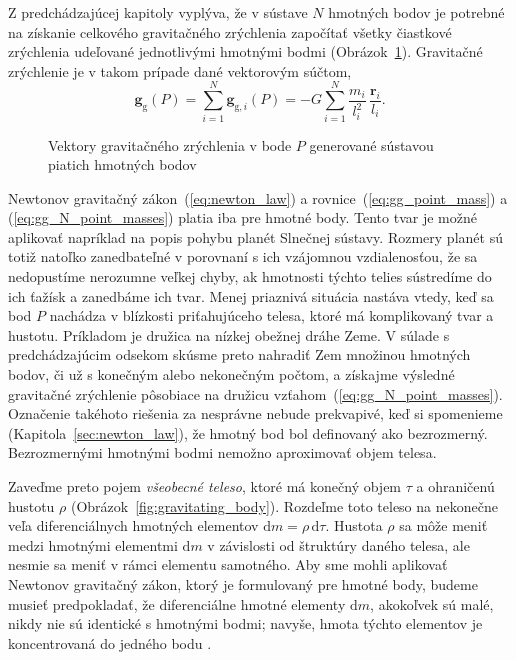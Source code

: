 \documentclass[a4paper, 12pt]{book}
\newcommand{\diff}{\mathrm d}
\newcommand{\gidx}{\mathrm g}
\let\vec\mathbf
\begin{document}
Z predchádzajúcej kapitoly vyplýva, že v sústave $N$ hmotných bodov je potrebné 
na získanie celkového gravitačného zrýchlenia započítať všetky čiastkové 
zrýchlenia udeľované jednotlivými hmotnými bodmi 
(Obrázok~\ref{fig:gg_n_point_masses}).  Gravitačné zrýchlenie je v takom 
prípade dané vektorovým súčtom,
%
\begin{equation}
\label{eq:gg_N_point_masses}
\vec g_\gidx(P) = \sum_{i = 1}^{N}\vec g_{\gidx,i}(P) = -G \sum_{i = 1}^{N} 
\frac{m_i}{l_i^2} \, \frac{\vec r_i}{l_i}{.}
\end{equation}

\begin{figure}[b]
\centering

\caption{Vektory gravitačného zrýchlenia v bode $P$ generované sústavou piatich 
hmotných bodov}
\label{fig:gg_n_point_masses}
\end{figure}

Newtonov gravitačný zákon~(\ref{eq:newton_law}) 
a rovnice~(\ref{eq:gg_point_mass}) 
a (\ref{eq:gg_N_point_masses}) platia iba pre hmotné body.  
Tento tvar je možné aplikovať napríklad na popis pohybu planét Slnečnej 
sústavy.  Rozmery planét sú totiž natoľko zanedbateľné v porovnaní s ich 
vzájomnou vzdialenosťou, že sa nedopustíme nerozumne veľkej chyby, ak hmotnosti 
týchto telies sústredíme do ich ťažísk a zanedbáme ich tvar.  Menej priaznivá 
situácia nastáva vtedy, keď sa bod $P$ nachádza v blízkosti priťahujúceho 
telesa, ktoré má komplikovaný tvar a hustotu.  Príkladom je družica na nízkej 
obežnej dráhe Zeme.  V súlade s predchádzajúcim odsekom skúsme preto nahradiť 
Zem množinou hmotných bodov, či už s konečným alebo nekonečným počtom, 
a získajme výsledné gravitačné zrýchlenie pôsobiace na družicu 
vzťahom~(\ref{eq:gg_N_point_masses}).  Označenie takéhoto 
riešenia za nesprávne nebude prekvapivé, keď si spomenieme 
(Kapitola~\ref{sec:newton_law}), že hmotný bod bol definovaný 
ako bezrozmerný.  Bezrozmernými hmotnými bodmi nemožno aproximovať objem 
telesa.

Zaveďme preto pojem \emph{všeobecné teleso}, ktoré má konečný objem $\tau$ 
a ohraničenú hustotu $\rho$ (Obrázok~\ref{fig:gravitating_body}).  Rozdeľme 
toto teleso na nekonečne veľa diferenciálnych hmotných elementov $\diff 
m = \rho \, \diff \tau$.  Hustota $\rho$ sa môže meniť medzi hmotnými elementmi 
$\diff m$ v závislosti od štruktúry daného telesa, ale nesmie sa meniť v rámci 
elementu samotného.  Aby sme mohli aplikovať Newtonov gravitačný zákon, ktorý 
je formulovaný pre hmotné body, budeme musieť predpokladať, že diferenciálne 
hmotné elementy $\diff m$, akokoľvek sú malé, nikdy nie sú identické s hmotnými 
bodmi; navyše, hmota týchto elementov je koncentrovaná do jedného bodu 
\citep{Kellogg1967}.
\end{document}
